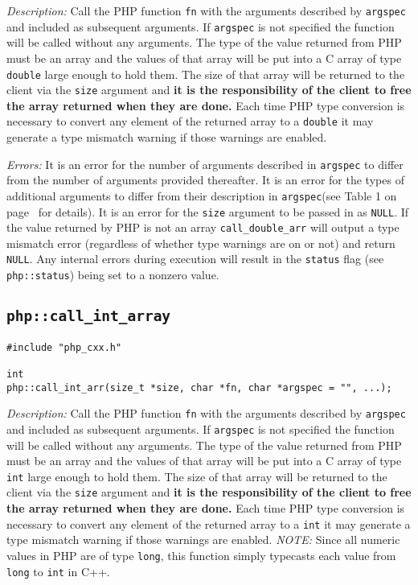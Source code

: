 \documentclass[11pt,titlepage]{article}
\begin{document}
\emph{Description:} Call the PHP function \verb|fn| with the arguments described by \verb|argspec| and included as subsequent arguments. If \verb|argspec| is not specified the function will be called without any arguments. The type of the value returned from PHP must be an array and the values of that array will be put into a C array of type \verb|double| large enough to hold them. The size of that array will be returned to the client via the \verb|size| argument and \textbf{it is the responsibility of the client to free the array returned when they are done.} Each time PHP type conversion is necessary to convert any element of the returned array to a \verb|double| it may generate a type mismatch warning if those warnings are enabled.

\emph{Errors:} It is an error for the number of arguments described in \verb|argspec| to differ from the number of arguments provided thereafter. It is an error for the types of additional arguments to differ from their description in \verb|argspec|(see Table 1 on page~\pageref{Table1} for details). It is an error for the \verb|size| argument to be passed in as \verb|NULL|. If the value returned by PHP is not an array \verb|call_double_arr| will output a type mismatch error (regardless of whether type warnings are on or not) and return \verb|NULL|. Any internal errors during execution will result in the \verb|status| flag (see \verb|php::status|) being set to a nonzero value.


\subsection{\texttt{php::call\_int\_array}}

\begin{verbatim}
#include "php_cxx.h"

int 
php::call_int_arr(size_t *size, char *fn, char *argspec = "", ...);
\end{verbatim}

\emph{Description:} Call the PHP function \verb|fn| with the arguments described by \verb|argspec| and included as subsequent arguments. If \verb|argspec| is not specified the function will be called without any arguments. The type of the value returned from PHP must be an array and the values of that array will be put into a C array of type \verb|int| large enough to hold them. The size of that array will be returned to the client via the \verb|size| argument and \textbf{it is the responsibility of the client to free the array returned when they are done.} Each time PHP type conversion is necessary to convert any element of the returned array to a \verb|int| it may generate a type mismatch warning if those warnings are enabled. \emph{NOTE:} Since all numeric values in PHP are of type \verb|long|, this function simply typecasts each value from \verb|long| to \verb|int| in C++.
\end{document}
